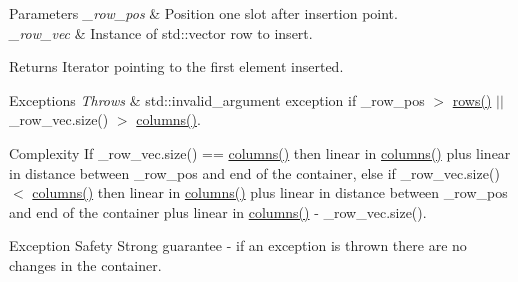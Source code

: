 \begin{DoxyParams}{Parameters}
{\em \+\_\+row\+\_\+pos} & Position one slot after insertion point. \\
\hline
{\em \+\_\+row\+\_\+vec} & Instance of {\ttfamily std\+::vector} row to insert. \\
\hline
\end{DoxyParams}
\begin{DoxyReturn}{Returns}
Iterator pointing to the first element inserted. 
\end{DoxyReturn}

\begin{DoxyExceptions}{Exceptions}
{\em Throws} & {\ttfamily std\+::invalid\+\_\+argument} exception if {\ttfamily \+\_\+row\+\_\+pos $>$ \hyperlink{classcrsc_1_1dynamic__matrix_a5d167a31d3be0ac09d3abdf57a11832d}{rows()} $\vert$$\vert$ \+\_\+row\+\_\+vec.\+size() $>$ \hyperlink{classcrsc_1_1dynamic__matrix_a43d52d7663b24b2175add500c7650d63}{columns()}}. \\
\hline
\end{DoxyExceptions}
\begin{DoxyParagraph}{Complexity}
If {\ttfamily \+\_\+row\+\_\+vec.\+size() == \hyperlink{classcrsc_1_1dynamic__matrix_a43d52d7663b24b2175add500c7650d63}{columns()}} then linear in {\ttfamily \hyperlink{classcrsc_1_1dynamic__matrix_a43d52d7663b24b2175add500c7650d63}{columns()}} plus linear in distance between {\ttfamily \+\_\+row\+\_\+pos} and {\ttfamily end} of the container, else if {\ttfamily \+\_\+row\+\_\+vec.\+size() $<$ \hyperlink{classcrsc_1_1dynamic__matrix_a43d52d7663b24b2175add500c7650d63}{columns()}} then linear in {\ttfamily \hyperlink{classcrsc_1_1dynamic__matrix_a43d52d7663b24b2175add500c7650d63}{columns()}} plus linear in distance between {\ttfamily \+\_\+row\+\_\+pos} and {\ttfamily end} of the container plus linear in {\ttfamily \hyperlink{classcrsc_1_1dynamic__matrix_a43d52d7663b24b2175add500c7650d63}{columns()} -\/ \+\_\+row\+\_\+vec.\+size()}. 
\end{DoxyParagraph}
\begin{DoxyParagraph}{Exception Safety}
Strong guarantee -\/ if an exception is thrown there are no changes in the container. 
\end{DoxyParagraph}
